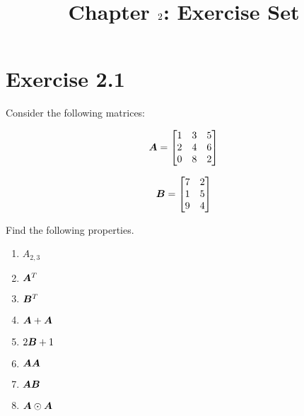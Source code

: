 \documentclass{article}
\author{}
\title{}
\date{\vspace{-5ex}}
\title{Chapter $\chapnumber$: Exercise Set}
\newcommand{\chapnumber}{2}
\begin{document}
\maketitle

\section*{Exercise \chapnumber.1}
Consider the following matrices:

\begin{equation}
{\bm{A}}
=
\begin{bmatrix}
    1 & 3 & 5 \\
    2 & 4 & 6 \\
    0 & 8 & 2 
\end{bmatrix}
\end{equation}

\begin{equation}
{\bm{B}}
=
\begin{bmatrix}
    7 & 2 \\
    1 & 5 \\
    9 & 4 
\end{bmatrix}
\end{equation}

Find the following properties.

\begin{enumerate}[label=(\alph*)]

\item $\textit{A}_{2,3}$
\item ${\bm{A}}^T$
\item ${\bm{B}}^T$
\item ${\bm{A}}+{\bm{A}}$
\item $2{\bm{B}}+1$
\item ${\bm{A}}{\bm{A}}$
\item ${\bm{A}}{\bm{B}}$
\item ${\bm{A}}\odot{\bm{A}}$

\end{enumerate} 
\end{document}
